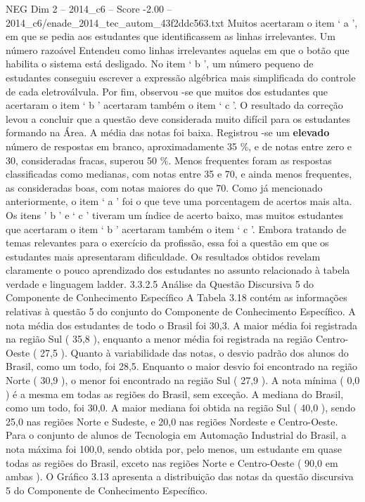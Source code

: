 \begin{textsample}{NEG Dim 2 – 2014\_c6 – Score -2.00 – 2014\_c6/enade\_2014\_tec\_autom\_43f2ddc563.txt}
Muitos acertaram o item ‘ a ’, em que se pedia aos estudantes que identificassem as linhas irrelevantes.
Um número razoável Entendeu como linhas irrelevantes aquelas em que o botão que habilita o sistema está desligado.
No item ‘ b ’, um número pequeno de estudantes conseguiu escrever a expressão algébrica mais simplificada do controle de cada eletroválvula.
Por fim, observou -se que muitos dos estudantes que acertaram o item ‘ b ’ acertaram também o item ‘ c ’.
O resultado da correção levou a concluir que a questão deve considerada muito difícil para os estudantes formando na Área.
A média das notas foi baixa.
Registrou -se um \textbf{elevado} número de respostas em branco, aproximadamente 35 \%, e de notas entre zero e 30, consideradas fracas, superou 50 \%.
Menos frequentes foram as respostas classificadas como medianas, com notas entre 35 e 70, e ainda menos frequentes, as consideradas boas, com notas maiores do que 70.
Como já mencionado anteriormente, o item ‘ a ’ foi o que teve uma porcentagem de acertos mais alta.
Os itens ’ b ’ e ‘ c ’ tiveram um índice de acerto baixo, mas muitos estudantes que acertaram o item ‘ b ’ acertaram também o item ‘ c ’.
Embora tratando de temas relevantes para o exercício da profissão, essa foi a questão em que os estudantes mais apresentaram dificuldade.
Os resultados obtidos revelam claramente o pouco aprendizado dos estudantes no assunto relacionado à tabela verdade e linguagem ladder. 3.3.2.5 Análise da Questão Discursiva 5 do Componente de Conhecimento Específico A Tabela 3.18 contém as informações relativas à questão 5 do conjunto do Componente de Conhecimento Específico.
A nota média dos estudantes de todo o Brasil foi 30,3.
A maior média foi registrada na região Sul ( 35,8 ), enquanto a menor média foi registrada na região Centro-Oeste ( 27,5 ).
Quanto à variabilidade das notas, o desvio padrão dos alunos do Brasil, como um todo, foi 28,5.
Enquanto o maior desvio foi encontrado na região Norte ( 30,9 ), o menor foi encontrado na região Sul ( 27,9 ).
A nota mínima ( 0,0 ) é a mesma em todas as regiões do Brasil, sem exceção.
A mediana do Brasil, como um todo, foi 30,0.
A maior mediana foi obtida na região Sul ( 40,0 ), sendo 25,0 nas regiões Norte e Sudeste, e 20,0 nas regiões Nordeste e Centro-Oeste.
Para o conjunto de alunos de Tecnologia em Automação Industrial do Brasil, a nota máxima foi 100,0, sendo obtida por, pelo menos, um estudante em quase todas as regiões do Brasil, exceto nas regiões Norte e Centro-Oeste ( 90,0 em ambas ).
O Gráfico 3.13 apresenta a distribuição das notas da questão discursiva 5 do Componente de Conhecimento Específico.

\end{textsample}
